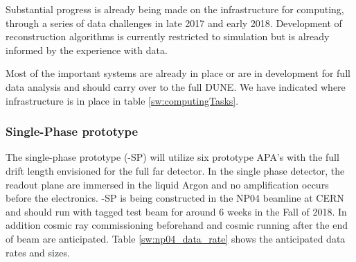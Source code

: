 Substantial progress is already being made on the infrastructure for computing, through a series of data challenges in late 2017 and early 2018. Development of reconstruction algorithms is currently restricted to simulation but is already informed by the experience with   data.


Most of the important systems are already in place or are in development for full  data analysis and should carry over to the full DUNE.
We have indicated where infrastructure is in place in  table  \ref{sw:computingTasks}.




\subsubsection{Single-Phase prototype}

The single-phase prototype (-SP) will utilize six prototype APA's with the full drift length envisioned for the full far detector. In the single phase detector, the readout plane are immersed in the liquid Argon and no amplification occurs before the electronics.    -SP is being constructed in the NP04 beamline at CERN and should run with tagged test beam for around 6 weeks in the Fall of 2018.  In addition cosmic ray commissioning beforehand and cosmic running after the end of beam are anticipated.  Table \ref{sw:np04_data_rate}
shows the anticipated data rates and sizes. 


